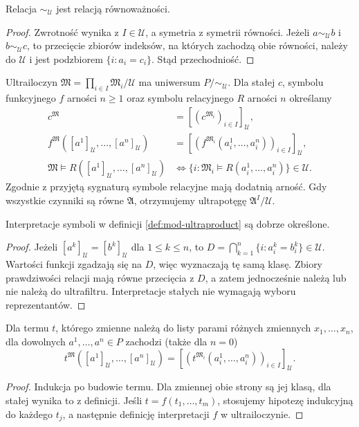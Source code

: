 \begin{lemat}
\label{lem:mod-ultra-equivalence}
Relacja $\sim_{\mathcal U}$ jest relacją równoważności.
\end{lemat}
\begin{proof}
Zwrotność wynika z $I\in\mathcal U$, a symetria z symetrii równości.
Jeżeli $a\sim_{\mathcal U}b$ i $b\sim_{\mathcal U}c$, to przecięcie
zbiorów indeksów, na których zachodzą obie równości, należy do
$\mathcal U$ i jest podzbiorem $\{i:a_i=c_i\}$. Stąd przechodniość.
\end{proof}

\begin{definicja}
\label{def:mod-ultraproduct}
Ultrailoczyn $\mathfrak M=\prod_{i\in I}\mathfrak M_i/\mathcal U$
ma uniwersum $P/{\sim_{\mathcal U}}$. Dla stałej $c$, symbolu
funkcyjnego $f$ arności $n\geq 1$ oraz symbolu relacyjnego $R$
arności $n$ określamy
\begin{align*}
c^{\mathfrak M}&=[(c^{\mathfrak M_i})_{i\in I}]_{\mathcal U},\\
f^{\mathfrak M}([a^1]_{\mathcal U},\ldots,[a^n]_{\mathcal U})
&=[(f^{\mathfrak M_i}(a_i^1,\ldots,a_i^n))_{i\in I}]_{\mathcal U},\\
\mathfrak M\models R([a^1]_{\mathcal U},\ldots,[a^n]_{\mathcal U})
&\Longleftrightarrow
\{i:\mathfrak M_i\models R(a_i^1,\ldots,a_i^n)\}\in\mathcal U.
\end{align*}
Zgodnie z przyjętą sygnaturą symbole relacyjne mają dodatnią
arność. Gdy wszystkie czynniki są równe $\mathfrak A$, otrzymujemy ultrapotęgę $\mathfrak A^I/\mathcal U$.
\end{definicja}

\begin{lemat}
\label{lem:mod-ultra-welldefined}
Interpretacje symboli w definicji \ref{def:mod-ultraproduct}
są dobrze określone.
\end{lemat}
\begin{proof}
Jeżeli $[a^k]_{\mathcal U}=[b^k]_{\mathcal U}$ dla $1\leq k\leq n$,
to $D=\bigcap_{k=1}^n\{i:a_i^k=b_i^k\}\in\mathcal U$.
Wartości funkcji zgadzają się na $D$, więc wyznaczają tę samą
klasę. Zbiory prawdziwości relacji mają równe przecięcia z $D$,
a zatem jednocześnie należą lub nie należą do ultrafiltru.
Interpretacje stałych nie wymagają wyboru reprezentantów.
\end{proof}

\begin{lemat}
\label{lem:mod-ultra-terms}
Dla termu $t$, którego zmienne należą do listy parami różnych
zmiennych $x_1,\ldots,x_n$, dla dowolnych $a^1,\ldots,a^n\in P$
zachodzi (także dla $n=0$)
\[
t^{\mathfrak M}([a^1]_{\mathcal U},\ldots,[a^n]_{\mathcal U})
=[(t^{\mathfrak M_i}(a_i^1,\ldots,a_i^n))_{i\in I}]_{\mathcal U}.
\]
\end{lemat}
\begin{proof}
Indukcja po budowie termu. Dla zmiennej obie strony są jej klasą,
dla stałej wynika to z definicji. Jeśli $t=f(t_1,\ldots,t_m)$,
stosujemy hipotezę indukcyjną do każdego $t_j$, a następnie
definicję interpretacji $f$ w ultrailoczynie.
\end{proof}

